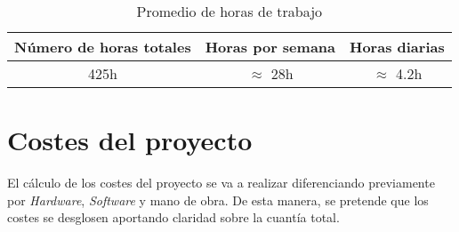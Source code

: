 \begin{sidewaysfigure}[ht!]
	\begin{center}
	\end{center}
	\label{gantt}
\end{sidewaysfigure}

\begin{table}[ht!]
	\centering
	\begin{tabular}{|c|c|c|}
		\hline
		\rowcolor[HTML]{EFEFEF}
		\textbf{Número de horas totales} & \textbf{Horas por semana} & \textbf{Horas diarias} \\ \hline
		425h                             & $\approx$ 28h             & $\approx$ 4.2h         \\ \hline
	\end{tabular}
	\caption{Promedio de horas de trabajo }
	\label{dig:horasTrabajadas}
\end{table}

\section{Costes del proyecto}

El cálculo de los costes del proyecto se va a realizar diferenciando previamente por \textit{Hardware}, \textit{Software} y mano de obra. De esta manera, se pretende que los costes se desglosen aportando claridad sobre la cuantía total.

